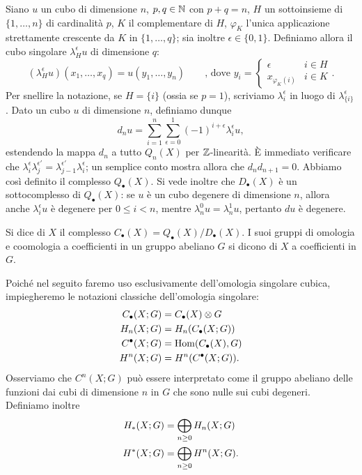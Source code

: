 Siano \(u\) un cubo di dimensione \(n\), \(p,q\in\mathbb{N}\) con \(p+q=n\), \(H\) un sottoinsieme di \(\{1,\ldots,n\}\) di cardinalità \(p\), \(K\) il complementare di \(H\), \(\varphi_K\) l'unica applicazione strettamente crescente da \(K\) in \(\{1,\ldots,q\}\); sia inoltre \(\epsilon\in\{0,1\}\). Definiamo allora il cubo singolare \(\lambda^\epsilon_Hu\) di dimensione \(q\):
\[
(\lambda^\epsilon_Hu)(x_1,\ldots,x_q)=u(y_1,\ldots,y_n)\qquad\text{, dove }y_i=\begin{cases}\epsilon&i\in H\\x_{\varphi_K(i)}&i\in K\end{cases}.
\]
Per snellire la notazione, se \(H=\{i\}\) (ossia se \(p=1\)), scriviamo \(\lambda^\epsilon_i\) in luogo di \(\lambda^\epsilon_{\{i\}}\). Dato un cubo \(u\) di dimensione \(n\), definiamo dunque
\[
d_nu=\sum_{i=1}^n\sum_{\epsilon=0}^1(-1)^{i+\epsilon}\lambda^\epsilon_iu,
\]
estendendo la mappa \(d_n\) a tutto \(Q_n(X)\) per \(\mathbb{Z}\)-linearità. È immediato verificare che \(\lambda^\epsilon_i\lambda^{\epsilon'}_j=\lambda^{\epsilon'}_{j-1}\lambda^\epsilon_i\); un semplice conto mostra allora che \(d_nd_{n+1}=0\). Abbiamo così definito il complesso \(Q_\bullet(X)\). Si vede inoltre che \(D_\bullet(X)\) è un sottocomplesso di \(Q_\bullet(X)\): se \(u\) è un cubo degenere di dimensione \(n\), allora anche \(\lambda^\epsilon_iu\) è degenere per \(0\le i<n\), mentre \(\lambda^0_nu=\lambda^1_nu\), pertanto \(du\) è degenere.
\begin{definition}
Si dice  di \(X\) il complesso \(C_\bullet(X)=Q_\bullet(X)/D_\bullet(X)\). I suoi gruppi di omologia e coomologia a coefficienti in un gruppo abeliano \(G\) si dicono  di \(X\) a coefficienti in \(G\).
\end{definition}
Poiché nel seguito faremo uso esclusivamente dell'omologia singolare cubica, impiegheremo le notazioni classiche dell'omologia singolare: 
\begin{align*}
C_\bullet(X;G)&=C_\bullet(X)\mathbin{\otimes} G\\
H_n(X;G)&=H_n(C_\bullet(X;G))\\
C^\bullet(X;G)&=\operatorname{Hom}(C_\bullet(X),G)\\
H^n(X;G)&=H^n(C^\bullet(X;G)).
\end{align*}
Osserviamo che \(C^n(X;G)\) può essere interpretato come il gruppo abeliano delle funzioni dai cubi di dimensione \(n\) in \(G\) che sono nulle sui cubi degeneri. Definiamo inoltre
\begin{align*}
H_*(X;G)&=\bigoplus_{n\ge 0}H_n(X;G)\\
H^*(X;G)&=\bigoplus_{n\ge 0}H^n(X;G).
\end{align*}

